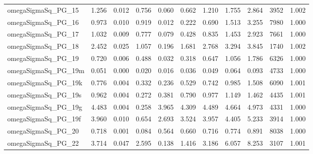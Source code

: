 \documentclass[12pt]{article}
\begin{document}
\begin{longtable}{lrrrrrrrrrr}
omegaSigmaSq\_PG\_15  & 1.256 & 0.012 & 0.756 & 0.060 & 0.662 & 1.210 & 1.755 & 2.864 &  3952 & 1.002 \\
omegaSigmaSq\_PG\_16  & 0.973 & 0.010 & 0.919 & 0.012 & 0.222 & 0.690 & 1.513 & 3.255 &  7980 & 1.000 \\
omegaSigmaSq\_PG\_17  & 1.032 & 0.009 & 0.777 & 0.079 & 0.428 & 0.835 & 1.453 & 2.923 &  7661 & 1.000 \\
omegaSigmaSq\_PG\_18  & 2.452 & 0.025 & 1.057 & 0.196 & 1.681 & 2.768 & 3.294 & 3.845 &  1740 & 1.002 \\
omegaSigmaSq\_PG\_19  & 0.720 & 0.006 & 0.488 & 0.032 & 0.318 & 0.647 & 1.056 & 1.786 &  6326 & 1.000 \\
omegaSigmaSq\_PG\_19m & 0.051 & 0.000 & 0.020 & 0.016 & 0.036 & 0.049 & 0.064 & 0.093 &  4733 & 1.000 \\
omegaSigmaSq\_PG\_19k & 0.776 & 0.004 & 0.332 & 0.236 & 0.529 & 0.742 & 0.985 & 1.508 &  6090 & 1.001 \\
omegaSigmaSq\_PG\_19s & 0.962 & 0.004 & 0.272 & 0.381 & 0.790 & 0.977 & 1.149 & 1.462 &  4435 & 1.001 \\
omegaSigmaSq\_PG\_19g & 4.483 & 0.004 & 0.258 & 3.965 & 4.309 & 4.489 & 4.664 & 4.973 &  4331 & 1.000 \\
omegaSigmaSq\_PG\_19f & 3.960 & 0.010 & 0.654 & 2.693 & 3.524 & 3.957 & 4.405 & 5.233 &  3914 & 1.000 \\
omegaSigmaSq\_PG\_20  & 0.718 & 0.001 & 0.084 & 0.564 & 0.660 & 0.716 & 0.774 & 0.891 &  8038 & 1.000 \\
omegaSigmaSq\_PG\_22  & 3.714 & 0.047 & 2.595 & 0.138 & 1.416 & 3.186 & 6.057 & 8.253 &  3107 & 1.001 \\
\end{longtable}
\endgroup


\newpage
\end{document}
